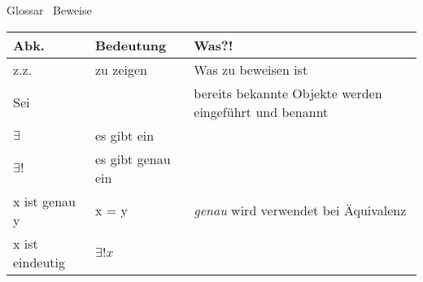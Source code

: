 %
%
%
%

\begin{frame}[fragile]{Glossar \textemdash\ Beweise}
	\small
	\begin{tabular}{p{} p{} p{}}
		\toprule
		Abk.            & Bedeutung         & Was?!                                                  \\
		\midrule
		z.z.            & zu zeigen         & Was zu beweisen ist                                    \\
		Sei             &                   & bereits bekannte Objekte werden eingeführt und benannt \\
		$\exists$       & es gibt ein       &                                                        \\
		$\exists !$     & es gibt genau ein &                                                        \\
		x ist genau y   & x = y             & \emph{genau} wird verwendet bei Äquivalenz             \\
		x ist eindeutig & $\exists ! x$     &                                                        \\
		\bottomrule
	\end{tabular}
\end{frame}


